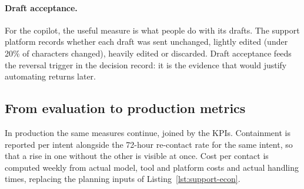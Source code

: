 \paragraph{Draft acceptance.} For the copilot, the useful measure is what people do with its drafts. The support platform records whether each draft was sent unchanged, lightly edited (under 20\% of characters changed), heavily edited or discarded. Draft acceptance feeds the reversal trigger in the decision record: it is the evidence that would justify automating returns later.

\subsection{From evaluation to production metrics}

In production the same measures continue, joined by the KPIs. Containment is reported per intent alongside the 72-hour re-contact rate for the same intent, so that a rise in one without the other is visible at once. Cost per contact is computed weekly from actual model, tool and platform costs and actual handling times, replacing the planning inputs of Listing~\ref{lst:support-econ}.
